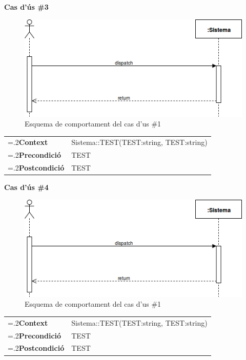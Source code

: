 \clearpage
\noindent\textbf{\large Cas d'ús \#3}\\
\begin{figure}[H]
\centering
\includegraphics[scale=0.6]{Figures/casdus_00.png}
\caption{Esquema de comportament del cas d'us \#1}
\end{figure}
\begin{table}[h]
\noindent
\begin{tabularx}{\linewidth}{
>{\hsize=.2\hsize}X%
>{\hsize=0.8\hsize}X%
}
\textbf{Context} 		& Sistema::TEST(TEST:string, TEST:string) \\
\textbf{Precondició} 	& TEST \\
\textbf{Postcondició}	& TEST \\
\end{tabularx}
\label{}
\end{table}

\noindent\textbf{\large Cas d'ús \#4}\\
\begin{figure}[H]
\centering
\includegraphics[scale=0.6]{Figures/casdus_00.png}
\caption{Esquema de comportament del cas d'us \#1}
\end{figure}
\begin{table}[h]
\noindent
\begin{tabularx}{\linewidth}{
>{\hsize=.2\hsize}X%
>{\hsize=0.8\hsize}X%
}
\textbf{Context} 		& Sistema::TEST(TEST:string, TEST:string) \\
\textbf{Precondició} 	& TEST \\
\textbf{Postcondició}	& TEST \\
\end{tabularx}
\label{}
\end{table}

